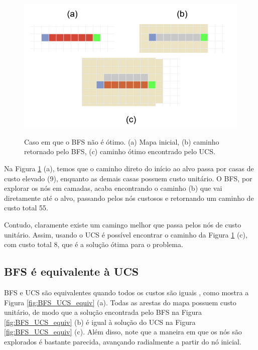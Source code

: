 \documentclass[letterpaper]{article} %
\begin{document}
\begin{figure}[htb]
	\centering 
    \caption{Caso em que o BFS não é ótimo. (a) Mapa inicial, (b)
	caminho retornado pelo BFS, (c) caminho ótimo encontrado pelo UCS.}
	\includegraphics[width=\columnwidth]{images/BFS_nao_otimo.png}
	\label{fig:BFS_nao_otimo}
\end{figure}

Na Figura \ref{fig:BFS_nao_otimo} (a), temos que o caminho direto do início ao alvo 
passa por casas de custo elevado (9), enquanto as demais casas possuem custo unitário.
O BFS, por explorar os nós em camadas, acaba encontrando o caminho (b) que vai diretamente 
até o alvo, passando pelos nós custosos e retornando um caminho de custo total 55.

Contudo, claramente existe um camingo melhor que passa pelos nós de custo unitário.
Assim, usando o UCS é possível encontrar o caminho da Figura \ref{fig:BFS_nao_otimo} (c), 
com custo total 8, que é a solução ótima para o problema.

\subsection{BFS é equivalente à UCS}

BFS e UCS são equivalentes quando todos os custos são iguais \cite{russell2020aima}, como mostra 
a Figura \ref{fig:BFS_UCS_equiv} (a). Todas as arestas do mapa possuem
 custo unitário, de modo que a solução encontrada pelo BFS na Figura \ref{fig:BFS_UCS_equiv} (b) 
 é igual à solução do UCS na Figura \ref{fig:BFS_UCS_equiv} (c). Além disso, note que 
 a maneira em que os nós são explorados é bastante parecida, avançando radialmente 
 a partir do nó inicial.
\end{document}
